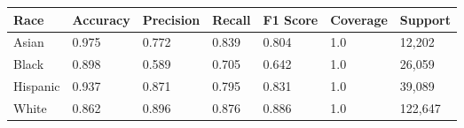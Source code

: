\begin{tabular}{lllllll}
\toprule
Race & Accuracy & Precision & Recall & F1 Score & Coverage & Support \\
\midrule
Asian & 0.975 & 0.772 & 0.839 & 0.804 & 1.0 & 12,202 \\
Black & 0.898 & 0.589 & 0.705 & 0.642 & 1.0 & 26,059 \\
Hispanic & 0.937 & 0.871 & 0.795 & 0.831 & 1.0 & 39,089 \\
White & 0.862 & 0.896 & 0.876 & 0.886 & 1.0 & 122,647 \\
\bottomrule
\end{tabular}
